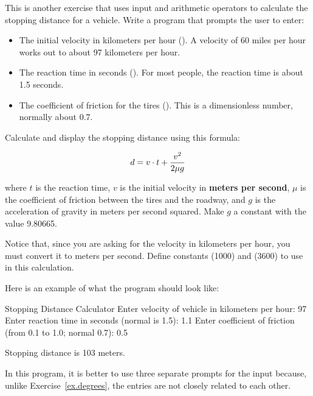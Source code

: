 \begin{exercise}
\label{brakingDistance}

This is another exercise that uses input and arithmetic operators to calculate the stopping distance for a vehicle. Write a program that prompts the user to enter:

\begin{itemize}

\item The initial velocity in kilometers per hour (). A velocity of 60 miles per hour works out to about 97 kilometers per hour.
\item The reaction time in seconds (). For most people, the reaction time is about 1.5 seconds.
\item The coefficient of friction for the tires (). This is a dimensionless number, normally about 0.7.

\end{itemize}

Calculate and display the stopping distance using this formula:

\begin{equation*}
d = v \cdot t + {v^2 \over {2 \mu g}}
\end{equation*}

where $t$ is the reaction time, $v$ is the initial velocity in {\bf meters per second}, $\mu$ is the coefficient of friction between the tires and the roadway, and $g$ is the acceleration of gravity in meters per second squared. Make $g$ a constant with the value 9.80665.

Notice that, since you are asking for the velocity in kilometers per hour, you must convert it to meters per second. Define constants  (1000) and  (3600) to use in this calculation.

Here is an example of what the program should look like:

\begin{stdout}
Stopping Distance Calculator
Enter velocity of vehicle in kilometers per hour: 97
Enter reaction time in seconds (normal is 1.5): 1.1
Enter coefficient of friction (from 0.1 to 1.0; normal 0.7): 0.5

Stopping distance is 103 meters.
\end{stdout}

In this program, it is better to use three separate prompts for the input because, unlike Exercise~\ref{ex.degrees}, the entries are not closely related to each other.
 
\end{exercise}

